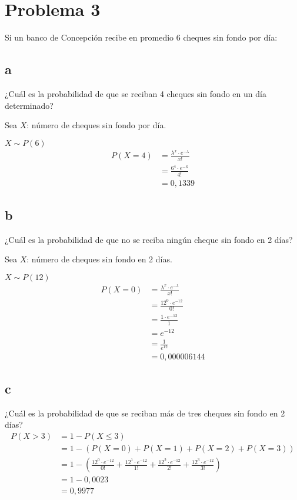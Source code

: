 \documentclass{templateNote}
\begin{document}
\newpage
\section{Problema 3}
Si un banco de Concepción recibe en promedio 6 cheques sin fondo por día:
\subsection{a}
¿Cuál es la probabilidad de que se reciban 4 cheques sin fondo en un día determinado?

Sea $X$: número de cheques sin fondo por día.

$X \sim P(6)$
\begin{align*}
    P(X=4) &= \frac{\lambda^x \cdot e^{-\lambda}}{x!} \\
    &= \frac{6^4 \cdot e^{-6}}{4!} \\
    &= 0,1339
\end{align*}

\subsection{b}
¿Cuál es la probabilidad de que no se reciba ningún cheque sin fondo en 2 días?

Sea $X$: número de cheques sin fondo en 2 días.

$X \sim P(12)$
\begin{align*}
    P(X=0) &= \frac{\lambda^x \cdot e^{-\lambda}}{x!} \\
    &= \frac{12^0 \cdot e^{-12}}{0!} \\
    &= \frac{1 \cdot e^{-12}}{1} \\
    &= e^{-12} \\
    &= \frac{1}{e^{12}} \\
    &= 0,000006144
\end{align*}
\subsection{c}
¿Cuál es la probabilidad de que se reciban más de tres cheques sin fondo en 2 días?
\begin{align*}
    P(X>3) &= 1 - P(X \leq 3)\\
    &= 1 - \left(P(X=0) + P(X=1) + P(X=2) + P(X=3)\right) \\
    &= 1 - \left(\frac{12^0 \cdot e^{-12}}{0!} + \frac{12^1 \cdot e^{-12}}{1!} + \frac{12^2 \cdot e^{-12}}{2!} + \frac{12^3 \cdot e^{-12}}{3!}\right) \\
    &= 1 - 0,0023 \\
    &= 0,9977
\end{align*}
\end{document}
